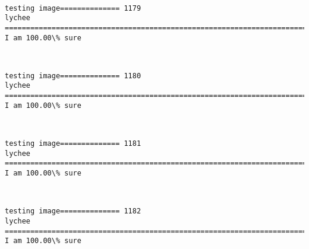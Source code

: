 \documentclass[11pt]{article}
\begin{document}
    \begin{center}
    \end{center}
    { \hspace*{\fill} \\}
    
    \begin{Verbatim}[commandchars=\\\{\}]
testing image============== 1179
lychee
============================================================================
I am 100.00\% sure

    \end{Verbatim}

    \begin{center}
    \end{center}
    { \hspace*{\fill} \\}
    
    \begin{Verbatim}[commandchars=\\\{\}]
testing image============== 1180
lychee
============================================================================
I am 100.00\% sure

    \end{Verbatim}

    \begin{center}
    \end{center}
    { \hspace*{\fill} \\}
    
    \begin{Verbatim}[commandchars=\\\{\}]
testing image============== 1181
lychee
============================================================================
I am 100.00\% sure

    \end{Verbatim}

    \begin{center}
    \end{center}
    { \hspace*{\fill} \\}
    
    \begin{Verbatim}[commandchars=\\\{\}]
testing image============== 1182
lychee
============================================================================
I am 100.00\% sure

    \end{Verbatim}
\end{document}
